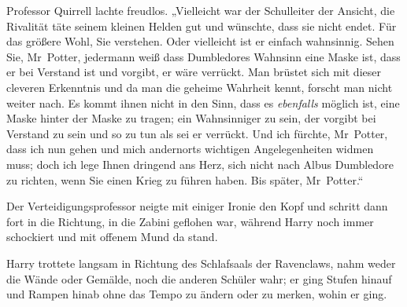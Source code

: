 Professor Quirrell lachte freudlos. „Vielleicht war der Schulleiter der Ansicht, die Rivalität täte seinem kleinen Helden gut und wünschte, dass sie nicht endet. Für das größere Wohl, Sie verstehen. Oder vielleicht ist er einfach wahnsinnig. Sehen Sie, Mr~Potter, jedermann weiß dass Dumbledores Wahnsinn eine Maske ist, dass er bei Verstand ist und vorgibt, er wäre verrückt. Man brüstet sich mit dieser cleveren Erkenntnis und da man die geheime Wahrheit kennt, forscht man nicht weiter nach. Es kommt ihnen nicht in den Sinn, dass es \emph{ebenfalls} möglich ist, eine Maske hinter der Maske zu tragen; ein Wahnsinniger zu sein, der vorgibt bei Verstand zu sein und so zu tun als sei er verrückt. Und ich fürchte, Mr~Potter, dass ich nun gehen und mich andernorts wichtigen Angelegenheiten widmen muss; doch ich lege Ihnen dringend ans Herz, sich nicht nach Albus Dumbledore zu richten, wenn Sie einen Krieg zu führen haben. Bis später, Mr~Potter.“

Der Verteidigungsprofessor neigte mit einiger Ironie den Kopf und schritt dann fort in die Richtung, in die Zabini geflohen war, während Harry noch immer schockiert und mit offenem Mund da stand.


Harry trottete langsam in Richtung des Schlafsaals der Ravenclaws, nahm weder die Wände oder Gemälde, noch die anderen Schüler wahr; er ging Stufen hinauf und Rampen hinab ohne das Tempo zu ändern oder zu merken, wohin er ging.

